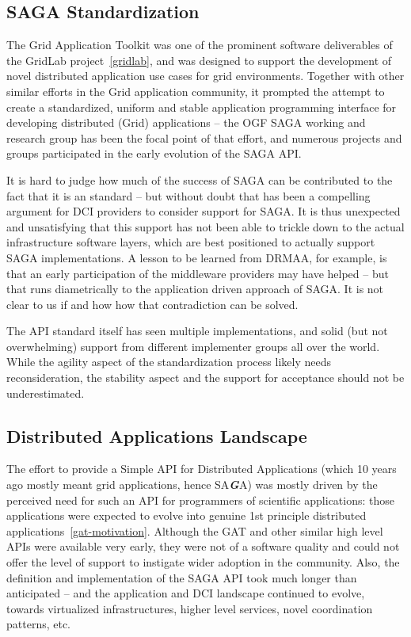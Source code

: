 \documentclass{article}
\newcommand{\BI}[1]{\textbf{\textit{#1}}}
\begin{document}
 \subsection{SAGA Standardization}

  The Grid Application Toolkit was one of the prominent software
  deliverables of the GridLab project~\ref{gridlab}, and was designed
  to support the development of novel distributed application use
  cases for grid environments.  Together with other similar efforts in
  the Grid application community, it prompted the attempt to create
  a standardized, uniform and stable application programming interface
  for developing distributed (Grid) applications -- the OGF SAGA
  working and research group has been the focal point of that effort,
  and numerous projects and groups participated in the early
  evolution of the SAGA API.  

  It is hard to judge how much of the success of SAGA can be
  contributed to the fact that it is an standard -- but without doubt
  that has been a compelling argument for DCI providers to consider
  support for SAGA.  It is thus unexpected and unsatisfying that this
  support has not been able to trickle down to the actual
  infrastructure software layers, which are best positioned to
  actually support SAGA implementations.  A lesson to be learned from
  DRMAA, for example, is that an early participation of the middleware
  providers may have helped -- but that runs diametrically to the
  application driven approach of SAGA.  It is not clear to us if and
  how how that contradiction can be solved.

  The API standard itself has seen multiple implementations, and solid
  (but not overwhelming) support from different implementer groups all
  over the world.  While the agility aspect of the standardization
  process likely needs reconsideration, the stability aspect and the
  support for acceptance should not be underestimated.


 \subsection{Distributed Applications Landscape}

  The effort to provide a Simple API for Distributed Applications
  (which 10 years ago mostly meant grid applications, hence SA\BI{G}A)
  was mostly driven by the perceived need for such an API for
  programmers of scientific applications: those applications were
  expected to evolve into genuine 1st principle distributed
  applications~\ref{gat-motivation}.  Although the GAT and other
  similar high level APIs were available very early, they were not of
  a software quality and could not offer the level of support to
  instigate wider adoption in the community.  Also, the definition and
  implementation of the SAGA API took much longer than anticipated --
  and the application and DCI landscape continued to evolve, towards
  virtualized infrastructures, higher level services, novel
  coordination patterns, etc.
  
\end{document}
